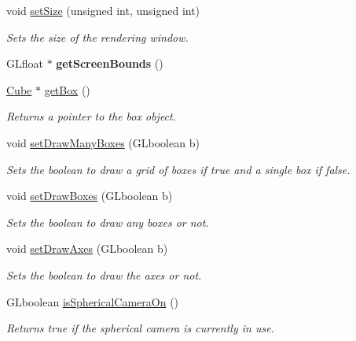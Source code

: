 \begin{DoxyCompactItemize}
void \hyperlink{class_graphics_engine_aac1a9cc3d195ed1f28018dffd80dae41}{set\+Size} (unsigned int, unsigned int)
\begin{DoxyCompactList}\small\item\em Sets the size of the rendering window. \end{DoxyCompactList}\item 
\mbox{\label{class_graphics_engine_a95a17b256079f26ca2b73ec3210317d2}} 
G\+Lfloat $\ast$ {\bfseries get\+Screen\+Bounds} ()
\item 
\mbox{\label{class_graphics_engine_a4f7faa74e2864431263006c70559ab9c}} 
\hyperlink{class_cube}{Cube} $\ast$ \hyperlink{class_graphics_engine_a4f7faa74e2864431263006c70559ab9c}{get\+Box} ()
\begin{DoxyCompactList}\small\item\em Returns a pointer to the box object. \end{DoxyCompactList}\item 
void \hyperlink{class_graphics_engine_ac1e139e3fb1cc18560f085f752ef871b}{set\+Draw\+Many\+Boxes} (G\+Lboolean b)
\begin{DoxyCompactList}\small\item\em Sets the boolean to draw a grid of boxes if true and a single box if false. \end{DoxyCompactList}\item 
void \hyperlink{class_graphics_engine_abe5ac289b57dbb1b2270efbeeeccda04}{set\+Draw\+Boxes} (G\+Lboolean b)
\begin{DoxyCompactList}\small\item\em Sets the boolean to draw any boxes or not. \end{DoxyCompactList}\item 
void \hyperlink{class_graphics_engine_abc1591d1873ad66188c5b7613606e8ab}{set\+Draw\+Axes} (G\+Lboolean b)
\begin{DoxyCompactList}\small\item\em Sets the boolean to draw the axes or not. \end{DoxyCompactList}\item 
G\+Lboolean \hyperlink{class_graphics_engine_a45375adf56d4769b0f33206dc760a1f6}{is\+Spherical\+Camera\+On} ()
\begin{DoxyCompactList}\small\item\em Returns true if the spherical camera is currently in use. \end{DoxyCompactList}\item 

\end{DoxyCompactItemize}
